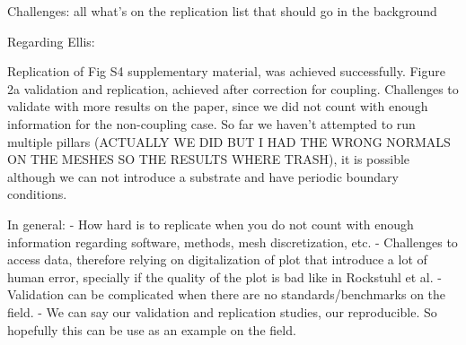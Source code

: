 Challenges: all what's on the replication list that should go in the background 

Regarding Ellis:

Replication of Fig S4 supplementary material, was achieved successfully. 
Figure 2a validation and replication, achieved after correction for coupling. 
Challenges to validate with more results on the paper, since we did not count with enough 
information for the non-coupling case. So far we haven't attempted to run multiple pillars 
(ACTUALLY WE DID BUT I HAD THE WRONG NORMALS ON THE MESHES SO THE RESULTS WHERE TRASH), it is possible although we can not
introduce a substrate and have periodic boundary conditions.  


In general:
- How hard is to replicate when you do not count with enough information regarding software, methods, mesh discretization, etc. 
- Challenges to access data, therefore relying on digitalization of plot that introduce a lot of human error, specially if the quality 
of the plot is bad like in Rockstuhl et al. 
- Validation can be complicated when there are no standards/benchmarks on the field.
- We can say our validation and replication studies, our reproducible. So hopefully this can be use as
 an example on the field. 